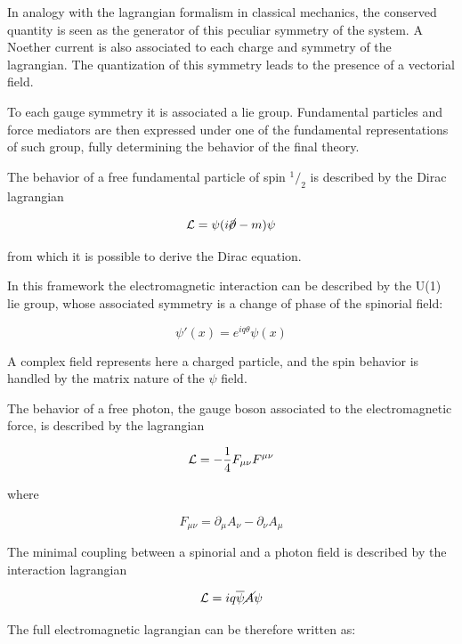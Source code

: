 In analogy with the lagrangian formalism in classical mechanics, the conserved quantity is seen as the generator of this peculiar symmetry of the system. A Noether current is also associated to each charge and symmetry of the lagrangian. The quantization of this symmetry leads to the presence of a vectorial field. 

To each gauge symmetry it is associated a lie group. Fundamental particles and force mediators are then expressed under one of the fundamental representations of such group, fully determining the behavior of the final theory.

The behavior of a free fundamental particle of spin $^1/_2$ is described by the Dirac lagrangian

\begin{equation}
\mathcal{L}=\psi(i\cancel{\partial}-m)\psi
\label{eq:dirac_lag}
\end{equation}

from which it is possible to derive the Dirac equation.

In this framework the electromagnetic interaction can be described by the U(1) lie group, whose associated symmetry is a change of phase of the spinorial field: %

\begin{equation}
\psi'(x) = e^{iq\theta}\psi(x)
\end{equation}

A complex field represents here a charged particle, and the spin behavior is handled by the matrix nature of the $\psi$ field.

The behavior of a free photon, the gauge boson associated to the electromagnetic force, is described by the lagrangian

\begin{equation}
\mathcal{L} = -\frac{1}{4}F_{\mu\nu}F^{\mu\nu}
\end{equation}

where

\begin{equation}
 F_{\mu\nu} =\partial_{\mu}A_{\nu}-\partial_{\nu}A_{\mu}
\end{equation}

The minimal coupling between a spinorial and a photon field is described by the interaction lagrangian

\begin{equation}
\mathcal{L} = iq \overline{\psi} \cancel{A} \psi 
\end{equation}

The full electromagnetic lagrangian can be therefore written as:

